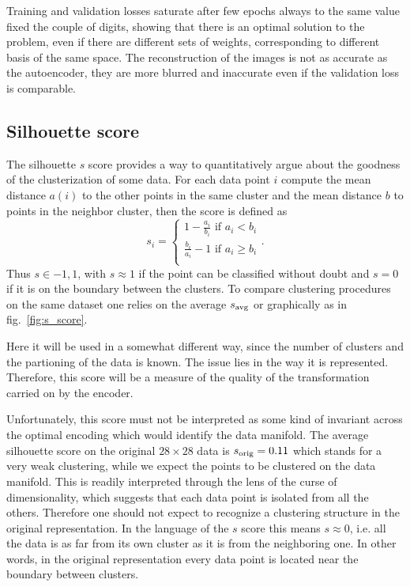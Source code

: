\documentclass[twocolumn,gsifonts,twoside]{gsipaper}
\begin{document}
Training and validation losses saturate after few epochs always to the same value fixed the couple of digits, showing that there is an optimal solution to the problem, even if there are different sets of weights, corresponding to different basis of the same space.
The reconstruction of the images is not as accurate as the autoencoder, they are more blurred and inaccurate even if the validation loss is comparable.

\subsection{Silhouette score}
The silhouette $s$ score \cite{Rousseeuw1987} provides a way to quantitatively argue about the goodness of the clusterization of some data. For each data point $i$ compute the mean distance $a(i)$ to the other points in the same cluster and the mean distance $b$ to points in the neighbor cluster, then the score is defined as
\[
s_i = 
\begin{cases}
  1 - \frac{a_i}{b_i} \text{ if } a_i < b_i \\
  \frac{b_i}{a_i} - 1 \text{ if } a_i \ge b_i \\
\end{cases}.
\]
Thus $s\in{-1,1}$, with $s\approx1$ if the point can be classified without doubt and $s=0$ if it is on the boundary between the clusters. To compare clustering procedures on the same dataset one relies on the average $s_\textup{avg}$ or graphically as in fig.~\ref{fig:s_score}.

Here it will be used in a somewhat different way, since the number of clusters and the partioning of the data is known. The issue lies in the way it is represented. Therefore, this score will be a measure of the quality of the transformation carried on by the encoder.

Unfortunately, this score must not be interpreted as some kind of invariant across the optimal encoding which would identify the data manifold. The average silhouette score on the original $28\times28$ data is $s_\textup{orig} = 0.11$ which stands for a very weak clustering, while we expect the points to be clustered on the data manifold. This is readily interpreted through the lens of the curse of dimensionality, which suggests that each data point is isolated from all the others. Therefore one should not expect to recognize a clustering structure in the original representation. In the language of the $s$ score this means $s\approx0$, i.e. all the data is as far from its own cluster as it is from the neighboring one. In other words, in the original representation every data point is located near the boundary between clusters.
\end{document}
